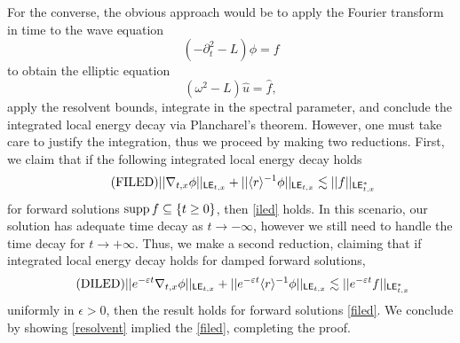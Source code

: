For the converse, the obvious approach would be to apply the Fourier transform in time to the wave equation 
	\[
		(- \partial_t^2 - L) \phi = f
	\] 
to obtain the elliptic equation 
	\[
		(\omega^2 - L) \widehat u = \widehat f,
	\]
apply the resolvent bounds, integrate in the spectral parameter, and conclude the integrated local energy decay via Plancharel's theorem. However, one must take care to justify the integration, thus we proceed by making two reductions. First, we claim that if the following integrated local energy decay holds
	\begin{equation}\label{eq:filed}\tag{$\mathrm{FILED}$}
		||\nabla_{t, x} \phi||_{\LE_{t, x}} + ||\langle r \rangle^{-1} \phi||_{\LE_{t, x}} \lesssim ||f||_{\LE^*_{t, x}}
	\end{equation}	
for forward solutions $\operatorname{supp} f \subseteq \{t \geq 0\}$, then \eqref{iled} holds. In this scenario, our solution has adequate time decay as $t \to - \infty$, however we still need to handle the time decay for $t \to + \infty$. Thus, we make a second reduction, claiming that if integrated local energy decay holds for damped forward solutions, 
	\begin{equation}\label{eq:diled}\tag{$\mathrm{DILED}$}
		|| e^{- \epsilon t} \nabla_{t, x} \phi||_{\LE_{t, x}} + ||e^{-\epsilon t} \langle r \rangle^{-1} \phi ||_{\LE_{t, x}} \lesssim ||e^{-\epsilon t} f ||_{\LE_{t, x}^*}
	\end{equation}
uniformly in $\epsilon > 0$, then the result holds for forward solutions \eqref{filed}. We conclude by showing \eqref{resolvent} implied the \eqref{filed}, completing the proof. 


